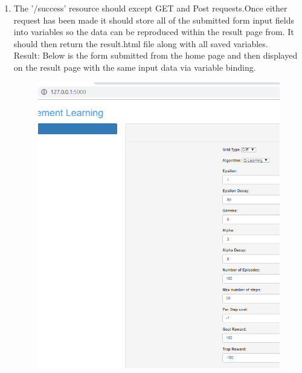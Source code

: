 \begin{enumerate}
	\item The '/success' resource should except GET and Post requests.Once either request has been made it should store all of the submitted form input fields into variables so the data can be reproduced within the result page from. It should then return the result.html file along with all saved variables.\\
	Result: Below is the form submitted from the home page and then displayed on the result page with the same input data via variable binding.
	\begin{figure}[H]
		\centering
		\includegraphics[width=1\linewidth]{"img/Form home"}
		\caption{}
		\label{fig:form-home}
	\end{figure}
	\begin{figure}[H]
		\centering

\end{figure}
\end{enumerate}
